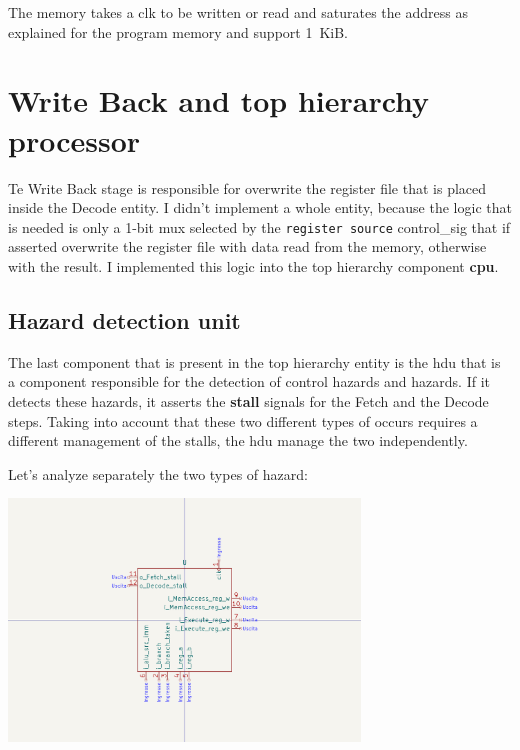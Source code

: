 \documentclass{article}
\begin{document}
The memory takes a \gls{clk} to be written or read and saturates the address as explained for the program memory 
and support \SI{1}{KiB}.


\section{Write Back and top hierarchy processor}\label{WB}
Te Write Back stage is responsible for overwrite the register file that is placed inside the Decode entity.
I didn't implement a whole entity, because the logic that is needed is only a 1-bit \acrfull{mux} selected
by the \texttt{register source} \gls{control_sig} that if asserted overwrite the register file with data
read from the memory, otherwise with the \ALU result. I implemented this logic into the top hierarchy component \textbf{\acrshort{cpu}}.

\subsection{Hazard detection unit}\label{HDU}
\begin{minipage}{0.48\textwidth}
The last component that is present in the top hierarchy entity is the \acrfull{hdu} that is a component responsible for the detection
of control \glspl{hazard} and \glspl{hazard}. If it detects these \glspl{hazard}, it asserts the \textbf{stall} signals for the Fetch
and the Decode steps. Taking into account that these two different types of occurs requires a different management of the stalls,
the \acrshort{hdu} manage the two independently.

Let's analyze separately the two types of \gls{hazard}:
\end{minipage}
\begin{minipage}{0.48\textwidth}
  \includegraphics[width=0.7\textwidth,right,trim={450 150 450 150},clip]{components/HDU.png}
\end{minipage}
\end{document}
